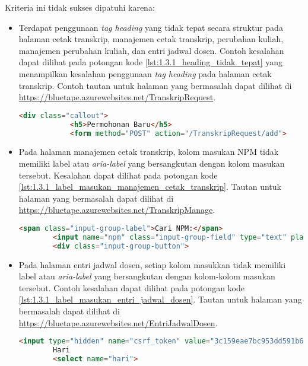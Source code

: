 Kriteria ini tidak sukses dipatuhi karena:
\begin{itemize}
    \item Terdapat penggunaan \textit{tag heading} yang tidak tepat secara struktur pada halaman cetak transkrip, manajemen cetak transkrip, perubahan kuliah, manajemen perubahan kuliah, dan entri jadwal dosen. Contoh kesalahan dapat dilihat pada potongan kode \ref{lst:1.3.1_heading_tidak_tepat} yang menampilkan kesalahan penggunaan \textit{tag heading} pada halaman cetak transkrip. Contoh tautan untuk halaman yang bermasalah dapat dilihat di \url{https://bluetape.azurewebsites.net/TranskripRequest}.
    \begin{lstlisting}[frame=single, label={lst:1.3.1_heading_tidak_tepat}, language=HTML, caption=Kriteria Sukses 1.3.1 - Penggunaan \textit{Heading} Tidak Tepat]
        <div class="callout">
            <h5>Permohonan Baru</h5>
            <form method="POST" action="/TranskripRequest/add">
    \end{lstlisting}

    \item Pada halaman manajemen cetak transkrip, kolom masukan NPM tidak memiliki label atau \textit{aria-label} yang bersangkutan dengan kolom masukan tersebut. Kesalahan dapat dilihat pada potongan kode \ref{lst:1.3.1_label_masukan_manajemen_cetak_transkrip}. Tautan untuk halaman yang bermasalah dapat dilihat di \url{https://bluetape.azurewebsites.net/TranskripManage}.
    \begin{lstlisting}[frame=single, label={lst:1.3.1_label_masukan_manajemen_cetak_transkrip}, language=HTML, caption=Kriteria Sukses 1.3.1 - Tidak Terdapat Label pada Kolom Masukan di Halaman Manajemen Cetak Transkrip]
        <span class="input-group-label">Cari NPM:</span>
        <input name="npm" class="input-group-field" type="text" placeholder="2013730013" maxlength="10" minlength="10"/>
        <div class="input-group-button">
    \end{lstlisting}

    \item Pada halaman entri jadwal dosen, setiap kolom masukkan tidak memiliki label atau \textit{aria-label} yang bersangkutan dengan kolom-kolom masukan tersebut. Contoh kesalahan dapat dilihat pada potongan kode \ref{lst:1.3.1_label_masukan_entri_jadwal_dosen}. Tautan untuk halaman yang bermasalah dapat dilihat di \url{https://bluetape.azurewebsites.net/EntriJadwalDosen}.
    \begin{lstlisting}[frame=single, label={lst:1.3.1_label_masukan_entri_jadwal_dosen}, language=HTML, caption=Kriteria Sukses 1.3.1 - Tidak Terdapat Label pada Kolom Masukan di Halaman Entri Jadwal Dosen]
        <input type="hidden" name="csrf_token" value="3c159eae7bc953dd591b679c080ed066"/>
        Hari
        <select name="hari">
    \end{lstlisting}
\end{itemize} 

